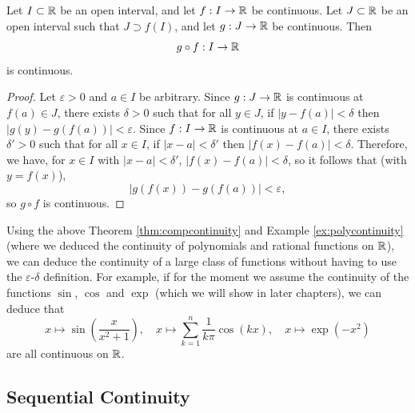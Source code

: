 \documentclass[../analysis1.tex]{subfiles}
\begin{document}
\begin{theorem}
\label{thm:compcontinuity}
    \begin{shaded*}
        Let $I\subset\mathbb{R}$ be an open interval, and let $f:I\to\mathbb{R}$ be continuous. Let $J\subset\mathbb{R}$ be an open interval such that $J\supset f(I)$, and let $g:J\to \mathbb{R}$ be continuous. Then
        \[g\circ f:I\to\mathbb{R}\] is continuous.
    \end{shaded*}
\end{theorem}
\begin{proof}
    Let $\varepsilon>0$ and $a\in I$ be arbitrary. Since $\allowbreak g:J\to\mathbb{R}$ is continuous at $f(a)\in J$, there exists $\delta>0$ such that for all $y\in J$, if $|y-f(a)|<\delta$ then $|g(y)-g(f(a))|<\varepsilon$. Since $f:I\to \mathbb{R}$ is continuous at $a\in I$, there exists $\delta'>0$ such that for all $x\in I$, if $|x-a|<\delta'$ then $|f(x)-f(a)|<\delta$. Therefore, we have, for $x\in I$ with $|x-a|<\delta'$, $|f(x)-f(a)|<\delta$, so it follows that (with $y=f(x)$),
    \[|g(f(x))-g(f(a))|<\varepsilon,\]
    so $g\circ f$ is continuous.\qedhere
\end{proof}

\begin{example}
    Using the above Theorem \ref{thm:compcontinuity} and Example \ref{ex:polycontinuity} (where we deduced the continuity of polynomials and rational functions on $\mathbb{R}$), we can deduce the continuity of a large class of functions without having to use the $\varepsilon$-$\delta$ definition. For example, if for the moment we assume the continuity of the functions $\sin$, $\cos$ and $\exp$ (which we will show in later chapters), we can deduce that
    \[x\mapsto \sin\left(\frac{x}{x^2+1}\right),\quad x\mapsto \sum_{k=1}^n \frac{1}{k\pi}\cos(kx),\quad x\mapsto\exp\left(-x^2\right)\]
    are all continuous on $\mathbb{R}$.
\end{example}


\subsection{Sequential Continuity}
\end{document}
